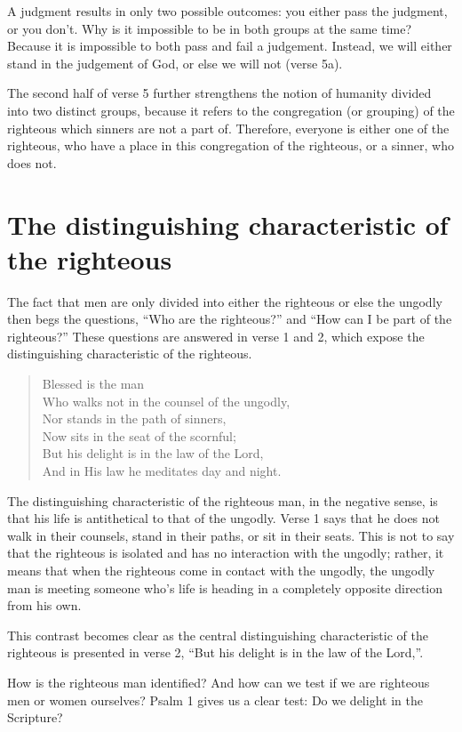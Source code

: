 \documentclass[a5paper]{book}
\newcommand{\Q}[1]{\begin{quote}#1\end{quote}}
\begin{document}
A judgment results in only two possible outcomes:
    you either pass the judgment, or you don't.
Why is it impossible to be in both groups at the same time?
Because it is impossible to both pass and fail a judgement.
Instead, we will either stand in the judgement of God,
    or else we will not (verse 5a).

The second half of verse 5 further strengthens the notion
    of humanity divided into two distinct groups,
    because it refers to the congregation (or grouping) of the righteous
    which sinners are not a part of.
Therefore, everyone is either one of the righteous,
    who have a place in this congregation of the righteous,
    or a sinner, who does not.
    
\section{The distinguishing characteristic of the righteous}
The fact that men are only divided into either 
    the righteous or else the ungodly 
    then begs the questions,
    ``Who are the righteous?'' and
    ``How can I be part of the righteous?''
These questions are answered in verse 1 and 2,
    which expose the distinguishing characteristic of the righteous.
    \Q{Blessed is the man \\
    Who walks not in the counsel of the ungodly, \\
    Nor stands in the path of sinners, \\
    Now sits in the seat of the scornful; \\
    But his delight is in the law of the Lord, \\
    And in His law he meditates day and night.}
    
The distinguishing characteristic of the righteous man,
    in the negative sense,
    is that his life is antithetical to that of the ungodly.
Verse 1 says that he does not walk in their counsels, 
    stand in their paths, or sit in their seats.
This is not to say that the righteous is isolated and
    has no interaction with the ungodly;
    rather, it means that when the righteous
    come in contact with the ungodly,
    the ungodly man is meeting someone who's life is heading
    in a completely opposite direction from his own.

This contrast becomes clear as the central distinguishing characteristic
    of the righteous is presented in verse 2,
    ``But his delight is in the law of the Lord,''.

How is the righteous man identified? 
And how can we test if we are righteous men or women ourselves?
Psalm 1 gives us a clear test:
    Do we delight in the Scripture?
\end{document}
